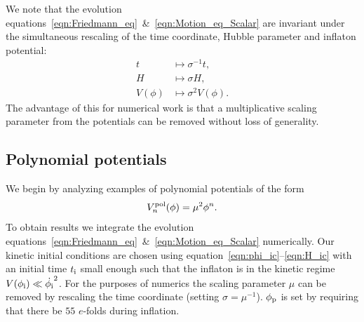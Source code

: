 We note that the evolution equations~\eqref{eqn:Friedmann_eq}~\&~\eqref{eqn:Motion_eq_Scalar} are invariant under  the simultaneous rescaling of the time coordinate, Hubble parameter and inflaton potential:
%
\begin{align}
  t 
  &\longmapsto 
  \sigma^{-1}t,
  \\
  H 
  &\longmapsto 
  \sigma H,
  \\
  V(\phi) 
  &\longmapsto
  \sigma^2 V(\phi).
\end{align}
%
The advantage of this for numerical work is that a multiplicative scaling parameter from the potentials can be removed without loss of generality.


\subsection{Polynomial potentials}
\label{sec:section_polynomial_potentials}
We begin by analyzing examples of polynomial potentials of the form
%
\begin{equation}
  V^\mathrm{pol}_n(\phi) = \mu^2\phi^n.
  \label{eqn:polpot}
\end{equation}
%
To obtain results we integrate the evolution equations~\eqref{eqn:Friedmann_eq}~\&~\eqref{eqn:Motion_eq_Scalar} numerically.  Our kinetic initial conditions are chosen using equation~\eqref{eqn:phi_ic}--\eqref{eqn:H_ic} with an initial time $t_{\mathrm{i}}$ small enough such that the inflaton is in the kinetic regime $V(\phi_{\mathrm{i}})\ll\dot{\phi_{\mathrm{i}}}^2$. For the purposes of numerics the scaling parameter $\mu$ can be removed by rescaling the time coordinate (setting $\sigma=\mu^{-1}$). $\phi_{\mathrm{p}}$ is set by requiring that there be $55$ $e$-folds during inflation.


